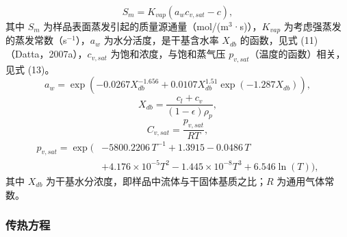 \documentclass[11pt,a4paper]{ctexart}
\begin{document}
\begin{equation}
S_m = K_{vap}(a_w c_{v,sat} - c),
\end{equation}
其中 $S_m$ 为样品表面蒸发引起的质量源通量（mol/(m$^3$·s)），$K_{vap}$ 为考虑强蒸发的蒸发常数（s$^{-1}$），$a_w$ 为水分活度，是干基含水率 $X_{db}$ 的函数，见式 (11)（Datta，2007a），$c_{v,sat}$ 为饱和浓度，与饱和蒸气压 $p_{v,sat}$（温度的函数）相关，见式 (13)。
\begin{equation}
a_w = \exp\left(-0.0267 X_{db}^{-1.656} + 0.0107 X_{db}^{1.51}\exp(-1.287 X_{db})\right),
\end{equation}
\begin{equation}
X_{db} = \frac{c_l + c_v}{(1-\epsilon)\rho_p},
\end{equation}
\begin{equation}
C_{v,sat} = \frac{p_{v,sat}}{RT},
\end{equation}
\begin{equation}
\begin{aligned}
p_{v,sat} = \exp\big(&-5800.2206\,T^{-1} + 1.3915 - 0.0486\,T \\
&+ 4.176\times10^{-5}T^{2} - 1.445\times10^{-8}T^{3} + 6.546\ln(T)\big),
\end{aligned}
\end{equation}
其中 $X_{db}$ 为干基水分浓度，即样品中流体与干固体基质之比；$R$ 为通用气体常数。

\subsubsection{传热方程}
\end{document}
